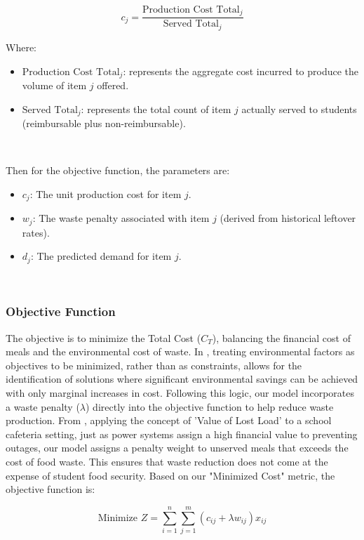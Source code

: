 \documentclass[journal]{IEEEtran}
\begin{document}
\begin{equation}
    c_j = \frac{\text{Production Cost Total}_j}{\text{Served Total}_j}
\end{equation}

Where:
\begin{itemize}
    \item $\text{Production Cost Total}_j$: represents the aggregate cost incurred to produce the volume of item $j$ offered.
    \item $\text{Served Total}_j$: represents the total count of item $j$ actually served to students (reimbursable plus non-reimbursable).
\end{itemize}

\

Then for the objective function, the parameters are:

\begin{itemize}
    \item $c_j$: The unit production cost for item $j$.
    \item $w_j$: The waste penalty associated with item $j$ (derived from historical leftover rates).
    \item $d_j$: The predicted demand for item $j$.
\end{itemize}

\

\subsubsection{Objective Function}
The objective is to minimize the Total Cost ($C_T$), balancing the financial cost of meals and the environmental cost of waste. In \cite{oliva}, treating environmental factors as objectives to be minimized, rather than as constraints, allows for the identification of solutions where significant environmental savings can be achieved with only marginal increases in cost. Following this logic, our model incorporates a waste penalty ($\lambda$) directly into the objective function to help reduce waste production. From \cite{afshar}, applying the concept of 'Value of Lost Load' to a school cafeteria setting, just as power systems assign a high financial value to preventing outages, our model assigns a penalty weight to unserved meals that exceeds the cost of food waste. This ensures that waste reduction does not come at the expense of student food security. Based on our "Minimized Cost" metric, the objective function is:

\begin{equation}
    \text{Minimize } Z = \sum_{i=1}^{n} \sum_{j=1}^{m} (c_{ij} + \lambda w_{ij}) x_{ij}
\end{equation}
\end{document}
